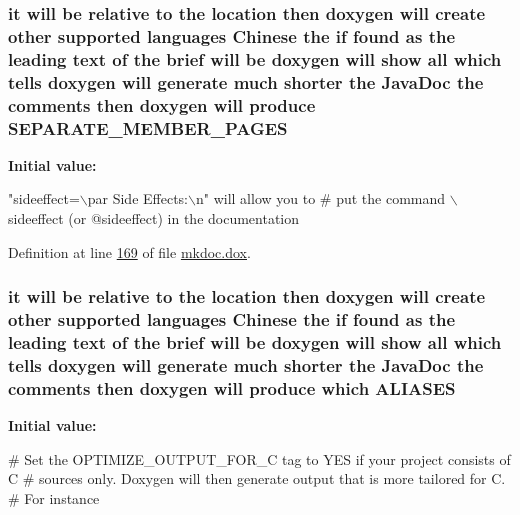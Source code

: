 \hypertarget{mkdoc_8dox_ad72e646b31fc3060000bd36feea98bbc}{
\subsubsection[{S\-E\-P\-A\-R\-A\-T\-E\-\_\-\-M\-E\-M\-B\-E\-R\-\_\-\-P\-A\-G\-E\-S}]{\setlength{\rightskip}{0pt plus 5cm}it will be relative to the location then doxygen will create other supported languages {\bf Chinese} the if found as the leading text of the brief will be doxygen will show all which tells doxygen will generate much shorter the Java\-Doc the comments then doxygen will produce S\-E\-P\-A\-R\-A\-T\-E\-\_\-\-M\-E\-M\-B\-E\-R\-\_\-\-P\-A\-G\-E\-S}}\label{mkdoc_8dox_ad72e646b31fc3060000bd36feea98bbc}
{\bfseries Initial value\-:}
\begin{DoxyCode}
\textcolor{stringliteral}{"sideeffect=\(\backslash\)par Side Effects:\(\backslash\)n"} will allow you to 
\textcolor{preprocessor}{# put the command \(\backslash\)sideeffect (or @sideeffect) in the documentation}
\end{DoxyCode}


Definition at line \hyperlink{mkdoc_8dox_source_l00169}{169} of file \hyperlink{mkdoc_8dox_source}{mkdoc.\-dox}.

\hypertarget{mkdoc_8dox_abb9f86499ee6f16a13b6e814f450db18}{
\subsubsection[{A\-L\-I\-A\-S\-E\-S}]{\setlength{\rightskip}{0pt plus 5cm}it will be relative to the location then doxygen will create other supported languages {\bf Chinese} the if found as the leading text of the brief will be doxygen will show all which tells doxygen will generate much shorter the Java\-Doc the comments then doxygen will produce which A\-L\-I\-A\-S\-E\-S}}\label{mkdoc_8dox_abb9f86499ee6f16a13b6e814f450db18}
{\bfseries Initial value\-:}
\begin{DoxyCode}
 

\textcolor{preprocessor}{# Set the OPTIMIZE\_OUTPUT\_FOR\_C tag to YES if your project consists of C }
\textcolor{preprocessor}{}\textcolor{preprocessor}{# sources only. Doxygen will then generate output that is more tailored for C. }
\textcolor{preprocessor}{# For instance}
\end{DoxyCode}


